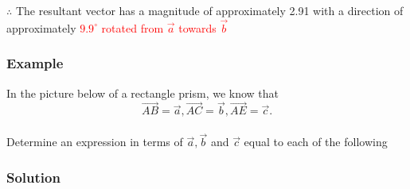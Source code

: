 \documentclass{article}
\begin{document}
$\therefore$ The resultant vector has a magnitude of approximately 2.91 with a direction of approximately \textcolor{red}{$9.9^{\circ}$ rotated from $\vec{a}$ towards $\Vec{b}$}

\subsubsection*{Example}
In the picture below of a rectangle prism, we know that $$\overrightarrow{AB}= \vec{a}, \overrightarrow{AC}=\vec{b}, \overrightarrow{AE}=\vec{c}.$$\\
Determine an expression in terms of $\vec{a}, \vec{b}$ and $\vec{c}$ equal to each of the following

\subsubsection*{Solution}
\end{document}
